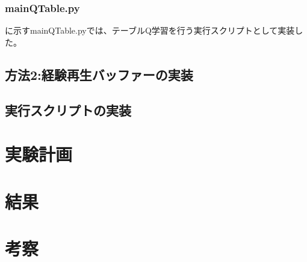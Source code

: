 \documentclass[a4paper,11pt]{jsarticle}
\begin{document}
\subsubsection{mainQTable.py} \label{seq:mainQTable}
に示すmainQTable.pyでは、テーブルQ学習を行う実行スクリプトとして実装した。
\par



\subsection{方法2:経験再生バッファーの実装}

\subsection{実行スクリプトの実装}





\section{実験計画}


\section{結果}

\section{考察}
\end{document}
